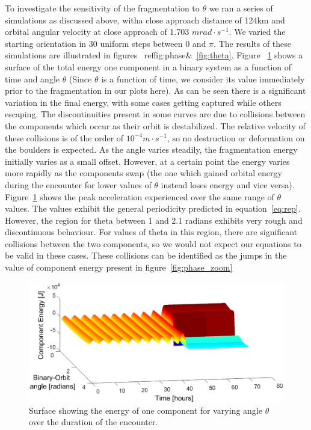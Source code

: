 \documentclass[letterpaper, preprint, paper,11pt]{AAS}	%
\begin{document}
To investigate the sensitivity of the fragmentation to $\theta$ we ran a series of simulations as discussed above, witha close approach distance of 124km and orbital angular velocity at close approach of 1.703 $mrad \cdot s^{-1}$. We varied the starting orientation in 30 uniform steps between 0 and $\pi$. The results of these simulations are illustrated in figures ~ref{fig:phase}\&~\ref{fig:theta}. Figure ~\ref{fig:phase} shows a surface of the total energy one component in a binary system as a function of time and angle $\theta$ (Since $\theta$ is a function of time, we consider its value immediately prior to the fragmentation in our plots here).
As can be seen there is a significant variation in the final energy, with some cases getting captured while others escaping. The discontinuities present in some curves are due to collisions between the components which occur as their orbit is destabilized. The relative velocity of these collisions is of the order of $10^{-4}m\cdot s^{-1}$,  so no destruction or deformation on the boulders is expected. As the angle varies steadily, the fragmentation energy initially varies as a small offset. However, at a certain point the energy varies more rapidly as the components swap (the one which gained orbital energy during the encounter for lower values of $\theta$ instead loses energy and vice versa). Figure~\ref{fig:phase} shows the peak acceleration experienced over the same range of $\theta$ values. The values exhibit the general periodicity predicted in equation~\ref{eq:rep}. However, the region for theta between 1 and 2.1 radians exhibits very rough and discontinuous behaviour. For values of theta in this region, there are significant collisions between the two components, so we would not expect our equations to be valid in these cases. These collisions can be identified as the jumps in the value of component energy present in figure~\ref{fig:phase_zoom}
 \begin{figure}[H]
\centering
\centerline{\includegraphics[width=1.2\textwidth]{phasing_energy_full.eps}} 
\caption{Surface showing the energy of one component for varying angle $\theta$ over the duration of the encounter.} 
\label{fig:phase}
\end{figure} 
\end{document}
